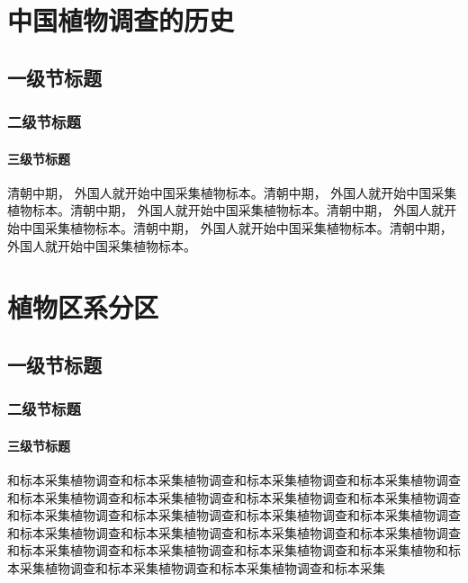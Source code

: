 \documentclass[utf8]{book}
\begin{document}
\chapter{中国植物调查的历史}

\section{一级节标题}

\subsection{二级节标题}

\subsubsection{三级节标题}

\begin{multicols}{2}

清朝中期， 外国人就开始中国采集植物标本。清朝中期， 外国人就开始中国采集植物标本。清朝中期， 外国人就开始中国采集植物标本。清朝中期， 外国人就开始中国采集植物标本。清朝中期， 外国人就开始中国采集植物标本。清朝中期， 外国人就开始中国采集植物标本。

\end{multicols}

\chapter{植物区系分区}

\section{一级节标题}

\subsection{二级节标题}

\subsubsection{三级节标题}

\begin{multicols}{2}
和标本采集植物调查和标本采集植物调查和标本采集植物调查和标本采集植物调查和标本采集植物调查和标本采集植物调查和标本采集植物调查和标本采集植物调查和标本采集植物调查和标本采集植物调查和标本采集植物调查和标本采集植物调查和标本采集植物调查和标本采集植物调查和标本采集植物调查和标本采集植物调查和标本采集植物调查和标本采集植物调查和标本采集植物调查和标本采集植物和标本采集植物调查和标本采集植物调查和标本采集植物调查和标本采集

\end{multicols}
\end{document}
